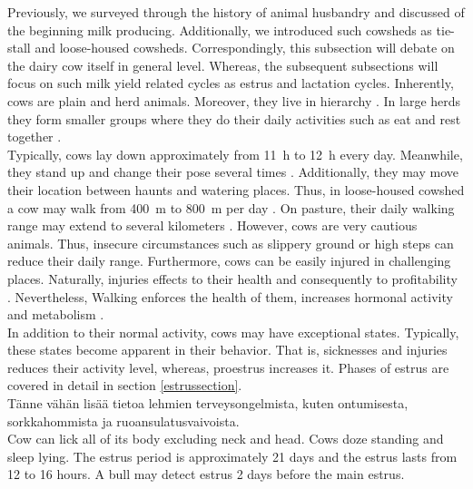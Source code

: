 \documentclass[english,12pt,a4paper,pdftex,elec,utf8]{aaltothesis}
\begin{document}
Previously, we surveyed through the history of animal husbandry and discussed of the beginning milk producing. Additionally, we introduced such cowsheds as tie-stall and loose-housed cowsheds. Correspondingly, this subsection will debate on the dairy cow itself in general level. Whereas, the subsequent subsections will focus on such milk yield related cycles as estrus and lactation cycles. Inherently, cows are plain and herd animals. Moreover, they live in hierarchy \cite{julkaisuja52}. In large herds they form smaller groups where they do their daily activities such as eat and rest together \cite{julkaisuja52} \cite{lehmahavaintoja}. \\

Typically, cows lay down approximately from \SI{11}{\hour} to \SI{12}{\hour} every day. Meanwhile, they stand up and change their pose several times \cite{luomunaudanruokinta}. Additionally, they may move their location between haunts and watering places. Thus, in loose-housed cowshed a cow may walk from  \SI{400}{\metre} to \SI{800}{\metre} per day \cite{luomuopas}. On pasture, their daily walking range may extend to several kilometers \cite{luomuopas} \cite{julkaisuja52}. However,  cows are very cautious animals. Thus, insecure circumstances such as slippery ground or high steps can reduce their daily range. Furthermore, cows can be easily injured in challenging places. Naturally, injuries effects to their health and consequently to profitability \cite{lehmahavaintoja}. Nevertheless, Walking enforces the health of them, increases hormonal activity and metabolism \cite{luomuopas}. \\

In addition to their normal activity, cows may have exceptional states. Typically, these states become apparent in their behavior. That is, sicknesses and injuries reduces their activity level, whereas, proestrus increases it. Phases of estrus are covered in detail in section \ref{estrussection}. \\

Tänne vähän lisää tietoa lehmien terveysongelmista, kuten ontumisesta, sorkkahommista ja ruoansulatusvaivoista. \\

 

 Cow can lick all of its body excluding neck and head. Cows doze standing and sleep lying. The estrus period is approximately 21 days and the estrus lasts from 12 to 16 hours. A bull may detect estrus 2 days before the main estrus.   \cite{julkaisuja52}
\end{document}
